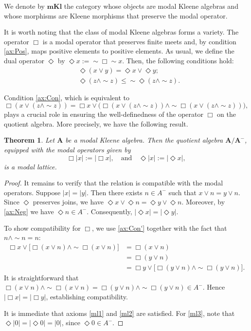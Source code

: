 \documentclass{article}
\newtheorem{theorem}{Theorem}[section]
\newcommand{\A}{\mathbf{A}}
\begin{document}
We denote by $\mathbf{mKl}$ the category whose objects are modal Kleene algebras and whose morphisms are Kleene morphisms that preserve the modal operator.

It is worth noting that the class of modal Kleene algebras forms a variety. The operator $\Box$ is a modal operator that preserves finite meets and, by condition \eqref{ax:Pos}, maps positive elements to positive elements. As usual, we define the dual operator $\Diamond$ by $\Diamond x := \sim \Box \sim x$. Then, the following conditions hold:
    \begin{align}
        \label{ax:MK'}
        &\Diamond(x \vee y) = \Diamond x \vee \Diamond y;\tag{MK'}\\
        \label{ax:Neg}
        &\Diamond(z \wedge \sim z)\leq \sim \Diamond(z \wedge \sim z).\tag{Neg}
    \end{align}

Condition \eqref{ax:Con}, which is equivalent to 
\begin{equation}
    \Box(x \vee (z \wedge \sim z))= \Box x\vee \big(\Box(x \vee (z \wedge \sim z))\wedge\sim \Box(x \vee (z \wedge \sim z))\big),\tag{Con'}\label{ax:Con'}
\end{equation} 
plays a crucial role in ensuring the well-definedness of the operator $\Box$ on the quotient algebra. More precisely, we have the following result.

\begin{theorem}
    Let $\A$ be a modal Kleene algebra. Then the quotient algebra $\mathbf{A/A^{-}}$, equipped with the modal operators given by
    \[
    \Box |x| := |\Box x|, \quad \text{and} \quad \Diamond |x| := |\Diamond x|,
    \]
    is a modal lattice.
\end{theorem}
\begin{proof}
It remains to verify that the relation is compatible with the modal operators. 
Suppose $|x| = |y|$. Then there exists $n \in A^{-}$ such that $x \vee n = y \vee n$. 
Since $\Diamond$ preserves joins, we have $\Diamond x \vee \Diamond n = \Diamond y \vee \Diamond n$. Moreover, by \eqref{ax:Neg} we have $\Diamond n \in A^{-}$. Consequently, $|\Diamond x| = |\Diamond y|$.

To show compatibility for $\Box$, we use \eqref{ax:Con'} together with the fact that $n \wedge \sim n = n$:
    \begin{align*}
        \Box x \vee \bigl[\Box(x\vee n)\wedge \sim \Box(x\vee n)\bigr] &= \Box (x\vee n)\\
        &= \Box (y\vee n)\\
        &= \Box y \vee \bigl[\Box(y \vee n)\wedge \sim \Box(y\vee n)\bigr].
    \end{align*}
    It is straightforward that $\Box(x\vee n)\wedge \sim \Box(x\vee n)=\Box(y\vee n)\wedge \sim \Box(y\vee n)\in A^-$. Hence $|\Box x| = |\Box y|$, establishing compatibility.

It is immediate that axioms \eqref{ml1} and \eqref{ml2} are satisfied. For \eqref{ml3}, note that $\Diamond |0| = |\Diamond 0| = |0|$, since $\Diamond 0 \in A^{-}$.
\end{proof}
\end{document}
